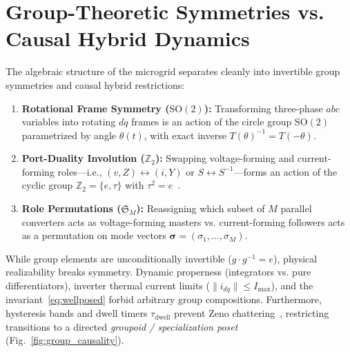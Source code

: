 \documentclass[journal]{IEEEtran}
\begin{document}
\section{Group-Theoretic Symmetries vs. Causal Hybrid Dynamics}
The algebraic structure of the microgrid separates cleanly into invertible group symmetries and causal hybrid restrictions:
\begin{enumerate}
    \item \textbf{Rotational Frame Symmetry ($\mathrm{SO}(2)$):} Transforming three-phase $abc$ variables into rotating $dq$ frames is an action of the circle group $\mathrm{SO}(2)$ parametrized by angle $\theta(t)$, with exact inverse $T(\theta)^{-1} = T(-\theta)$.
    \item \textbf{Port-Duality Involution ($\mathbb{Z}_2$):} Swapping voltage-forming and current-forming roles—i.e., $(v, Z) \leftrightarrow (i, Y)$ or $S \leftrightarrow S^{-1}$—forms an action of the cyclic group $\mathbb{Z}_2 = \{e, \tau\}$ with $\tau^2 = e$~\cite{Li2022Duality}.
    \item \textbf{Role Permutations ($\mathfrak{S}_M$):} Reassigning which subset of $M$ parallel converters acts as voltage-forming masters vs. current-forming followers acts as a permutation on mode vectors $\boldsymbol{\sigma} = (\sigma_1, \dots, \sigma_M)$.
\end{enumerate}

While group elements are unconditionally invertible ($g \cdot g^{-1} = e$), physical realizability breaks symmetry. Dynamic properness (integrators vs. pure differentiators), inverter thermal current limits ($\|i_{dq}\| \le I_{\max}$), and the invariant~\eqref{eq:wellposed} forbid arbitrary group compositions. Furthermore, hysteresis bands and dwell timers $\tau_{\mathrm{dwell}}$ prevent Zeno chattering~\cite{Nerode1993,Simic2005}, restricting transitions to a directed \emph{groupoid / specialization poset} (Fig.~\ref{fig:group_causality}).
\end{document}
